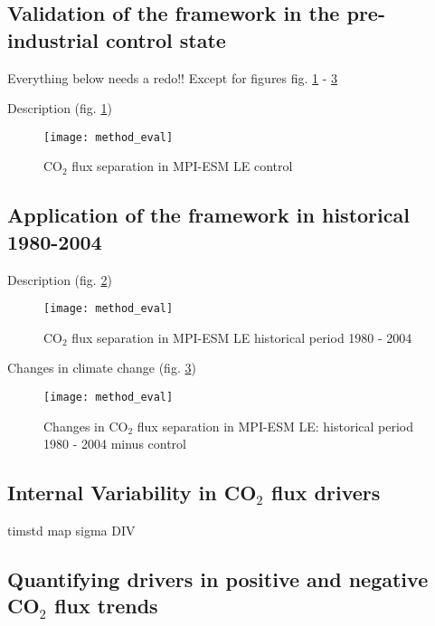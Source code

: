 \clearpage

\subsection{Validation of the framework in the pre-industrial control state}
Everything below needs a redo!! Except for figures fig. \ref{fig:CO2flux_separation_control} - \ref{fig:CO2flux_separation_hist-control}


Description (fig. \ref{fig:CO2flux_separation_control})

\begin{figure}[h!]
	\centering
	\texttt{[image: method\_eval]}
	\caption{CO$_2$ flux separation in MPI-ESM LE control}	
	\label{fig:CO2flux_separation_control}
\end{figure}




\subsection{Application of the framework in historical 1980-2004}

Description (fig. \ref{fig:CO2flux_separation_hist})

\begin{figure}[h!]
	\centering
	\texttt{[image: method\_eval]}
	\caption{CO$_2$ flux separation in MPI-ESM LE historical period 1980 - 2004}	
	\label{fig:CO2flux_separation_hist}
\end{figure}

Changes in climate change (fig. \ref{fig:CO2flux_separation_hist-control})

\begin{figure}[h!]
	\centering
	\texttt{[image: method\_eval]}
	\caption{Changes in CO$_2$ flux separation in MPI-ESM LE: historical period 1980 - 2004 minus control}	
	\label{fig:CO2flux_separation_hist-control}
\end{figure}

\subsection{Internal Variability in CO$_2$ flux drivers}

timstd map sigma DIV


\subsection{Quantifying drivers in positive and negative CO$_2$ flux trends}

